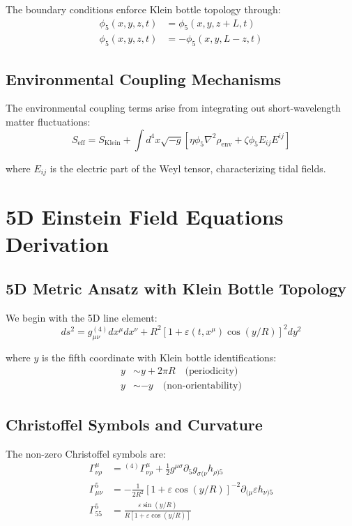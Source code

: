 \documentclass[12pt]{iopart}
\begin{document}
The boundary conditions enforce Klein bottle topology through:
\begin{align}
\phi_5(x,y,z,t) &= \phi_5(x,y,z+L,t)\\
\phi_5(x,y,z,t) &= -\phi_5(x,y,L-z,t)
\end{align}

\subsection{Environmental Coupling Mechanisms}

The environmental coupling terms arise from integrating out short-wavelength matter fluctuations:
\begin{equation}
S_{\text{eff}} = S_{\text{Klein}} + \int d^4x \sqrt{-g}\left[\eta\phi_5\nabla^2\rho_{\text{env}} + \zeta\phi_5 E_{ij}E^{ij}\right]
\end{equation}

where $E_{ij}$ is the electric part of the Weyl tensor, characterizing tidal fields.

\section{5D Einstein Field Equations Derivation}
\label{app:5d_einstein}

\subsection{5D Metric Ansatz with Klein Bottle Topology}

We begin with the 5D line element:
\begin{equation}
ds^2 = g_{\mu\nu}^{(4)}dx^\mu dx^\nu + R^2[1 + \varepsilon(t,x^\mu)\cos(y/R)]^2 dy^2
\end{equation}

where $y$ is the fifth coordinate with Klein bottle identifications:
\begin{align}
y &\sim y + 2\pi R \quad \text{(periodicity)}\\
y &\sim -y \quad \text{(non-orientability)}
\end{align}

\subsection{Christoffel Symbols and Curvature}

The non-zero Christoffel symbols are:
\begin{align}
\Gamma^\mu_{\nu\rho} &= {}^{(4)}\Gamma^\mu_{\nu\rho} + \frac{1}{2}g^{\mu\sigma}\partial_5 g_{\sigma(\nu}h_{\rho)5}\\
\Gamma^5_{\mu\nu} &= -\frac{1}{2R^2}[1 + \varepsilon\cos(y/R)]^{-2}\partial_{(\mu}\varepsilon h_{\nu)5}\\
\Gamma^5_{55} &= \frac{\varepsilon\sin(y/R)}{R[1 + \varepsilon\cos(y/R)]}
\end{align}
\end{document}
